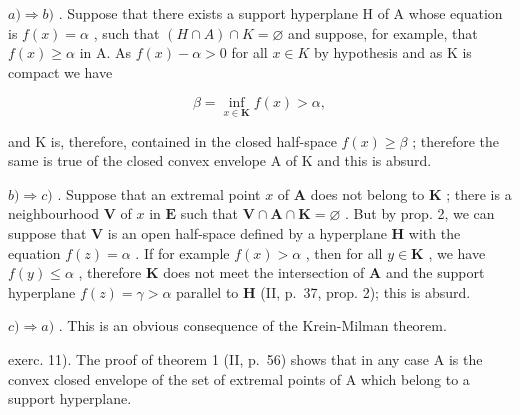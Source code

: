 \(a) \Rightarrow b)\) . Suppose that there exists a support hyperplane H of A whose equation is \(f(x) = \alpha\) , such that \((H \cap A) \cap K = \varnothing\) and suppose, for example, that \(f(x) \geqslant \alpha\) in A. As \(f(x) - \alpha > 0\) for all \(x \in K\) by hypothesis and as K is compact we have

\[
\beta = \inf _ {x \in \mathbf {K}} f (x) > \alpha ,
\]

and K is, therefore, contained in the closed half-space \(f(x) \geqslant \beta\) ; therefore the same is true of the closed convex envelope A of K and this is absurd.

\(b) \Rightarrow c)\) . Suppose that an extremal point \(x\) of \(\mathbf{A}\) does not belong to \(\mathbf{K}\) ; there is a neighbourhood \(\mathbf{V}\) of \(x\) in \(\mathbf{E}\) such that \(\mathbf{V} \cap \mathbf{A} \cap \mathbf{K} = \varnothing\) . But by prop. 2, we can suppose that \(\mathbf{V}\) is an open half-space defined by a hyperplane \(\mathbf{H}\) with the equation \(f(z) = \alpha\) . If for example \(f(x) > \alpha\) , then for all \(y \in \mathbf{K}\) , we have \(f(y) \leqslant \alpha\) , therefore \(\mathbf{K}\) does not meet the intersection of \(\mathbf{A}\) and the support hyperplane \(f(z) = \gamma > \alpha\) parallel to \(\mathbf{H}\) (II, p.~37, prop. 2); this is absurd.

\(c) \Rightarrow a)\) . This is an obvious consequence of the Krein-Milman theorem.

exerc. 11). The proof of theorem 1 (II, p.~56) shows that in any case A is the convex closed envelope of the set of extremal points of A which belong to a support hyperplane.

